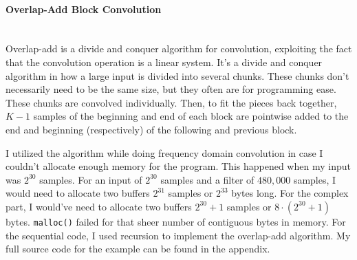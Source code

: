\paragraph{Overlap-Add Block Convolution} \hspace{0pt} \\
\indent Overlap-add is a divide and conquer algorithm for convolution, exploiting the fact that the convolution operation is a linear system. It's a divide and conquer algorithm in how a large input is divided into several chunks. These chunks don't necessarily need to be the same size, but they often are for programming ease. These chunks are convolved individually. Then, to fit the pieces back together, $K-1$ samples of the beginning and end of each block are pointwise added to the end and beginning (respectively) of the following and previous block. 

I utilized the algorithm while doing frequency domain convolution in case I couldn't allocate enough memory for the program. This happened when my input was $2^{30}$ samples. For an input of $2^{30}$ samples and a filter of $480,000$ samples, I would need to allocate two buffers $2^{31}$ samples or $2^{33}$ bytes long. For the complex part, I would've need to allocate two buffers $2^{30} + 1$ samples or $8 \cdot (2^{30} + 1)$ bytes. \verb|malloc()| failed for that sheer number of contiguous bytes in memory. For the sequential code, I used recursion to implement the overlap-add algorithm. My full source code for the example can be found in the appendix. 

\begin{changemargin}
\def\excerpt{\thispagestyle{empty} \paragraph{Overlap-Add Block Algorithm} \hspace{0pt} \\}

\end{changemargin}